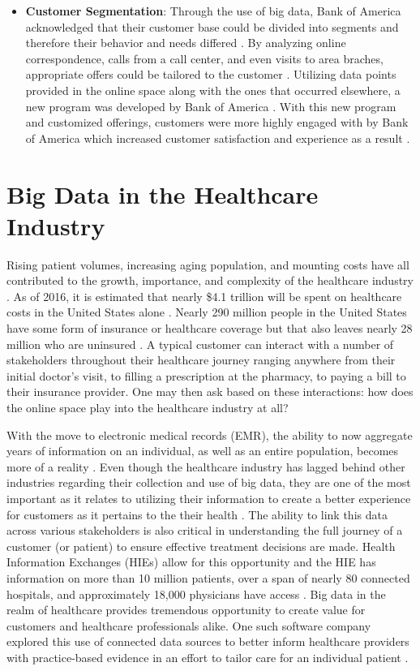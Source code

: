 \documentclass[sigconf]{acmart}
\begin{document}
 \begin{itemize}
 \item \textbf{Customer Segmentation}: Through the use of big data, Bank of America acknowledged that their customer base could be divided into segments and therefore their behavior and needs differed \cite{Davenport2013}. By analyzing online correspondence, calls from a call center, and even visits to area braches, appropriate offers could be tailored to the customer \cite{Davenport2013}. Utilizing data points provided in the online space along with the ones that occurred elsewhere, a new program was developed by Bank of America \cite{Davenport2013}. With this new program and customized offerings, customers were more highly engaged with by Bank of America which increased customer satisfaction and experience as a result \cite{Davenport2013}.  
  \end{itemize}
  
\section{Big Data in the Healthcare Industry}
Rising patient volumes, increasing aging population, and mounting costs have all contributed to the growth, importance, and complexity of the healthcare industry \cite{Nambiar2013}. As of 2016, it is estimated that nearly \$4.1 trillion will be spent on healthcare costs in the United States alone \cite{Nambiar2013}. Nearly 290 million people in the United States have some form of insurance or healthcare coverage but that also leaves nearly 28 million who are uninsured \cite{Foundation2016}. A typical customer can interact with a number of stakeholders throughout their healthcare journey ranging anywhere from their initial doctor's visit, to filling a prescription at the pharmacy, to paying a bill to their insurance provider. One may then ask based on these interactions: how does the online space play into the healthcare industry at all?

With the move to electronic medical records (EMR), the ability to now aggregate years of information on an individual, as well as an entire population, becomes more of a reality \cite{Froves2013}. Even though the healthcare industry has lagged behind other industries regarding their collection and use of big data, they are one of the most important as it relates to utilizing their information to create a better experience for customers as it pertains to the their health \cite{Froves2013}. The ability to link this data across various stakeholders is also critical in understanding the full journey of a customer (or patient) to ensure effective treatment decisions are made. Health Information Exchanges (HIEs) allow for this opportunity and the HIE has information on more than 10 million patients, over a span of nearly 80 connected hospitals, and approximately 18,000 physicians have access \cite{Froves2013}. Big data in the realm of healthcare provides tremendous opportunity to create value for customers and healthcare professionals alike. One such software company explored this use of connected data sources to better inform healthcare providers with practice-based evidence in an effort to tailor care for an individual patient \cite{Central2017}.
\end{document}
